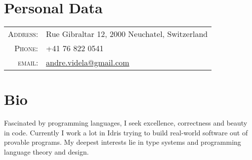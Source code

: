 \documentclass[a4paper,10pt]{article} %
\begin{document}
\pagestyle{empty} %


\par{\bigskip\par} %
\par{\bigskip\par} %
\section{Personal Data}

\begin{tabular}{rl}
\textsc{Address:} & Rue Gibraltar 12, 2000 Neuchatel, Switzerland \\
\textsc{Phone:} & +41 76 822 0541\\
\textsc{email:} & \href{mailto:andre.videla@gmail.com}{andre.videla@gmail.com}
\end{tabular}


\section{Bio}
Fascinated by programming languages, I seek excellence, correctness and beauty in code. Currently I work a lot in Idris trying to build real-world software out of provable programs. My deepest interests lie in type systems and programming language theory and design.

\end{document}
